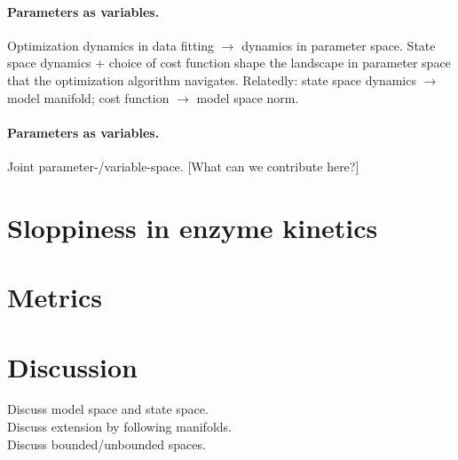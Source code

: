\documentclass{article}
\begin{document}
\paragraph{Parameters as variables.}
Optimization dynamics in data fitting $\rightarrow$ dynamics in
parameter space. State space dynamics + choice of cost function shape
the landscape in parameter space that the optimization algorithm
navigates.  Relatedly: state space dynamics $\rightarrow$ model
manifold; cost function $\rightarrow$ model space norm.

\paragraph{Parameters as variables.}
Joint parameter-/variable-space.
[What can we contribute here?]


\section{Sloppiness in enzyme kinetics}




\section{Metrics}


\section{Discussion}

Discuss model space and state space.\\

Discuss extension by following manifolds.\\

Discuss bounded/unbounded spaces.\\
\end{document}
